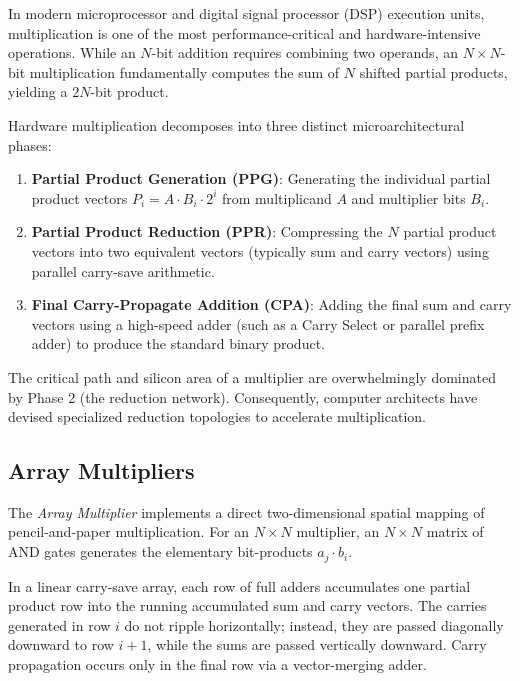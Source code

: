In modern microprocessor and digital signal processor (DSP) execution units, multiplication is one of the most performance-critical and hardware-intensive operations. While an $N$-bit addition requires combining two operands, an $N \times N$-bit multiplication fundamentally computes the sum of $N$ shifted partial products, yielding a $2N$-bit product.

Hardware multiplication decomposes into three distinct microarchitectural phases:
\begin{enumerate}
    \item \textbf{Partial Product Generation (PPG)}: Generating the individual partial product vectors $P_i = A \cdot B_i \cdot 2^i$ from multiplicand $A$ and multiplier bits $B_i$.
    \item \textbf{Partial Product Reduction (PPR)}: Compressing the $N$ partial product vectors into two equivalent vectors (typically sum and carry vectors) using parallel carry-save arithmetic.
    \item \textbf{Final Carry-Propagate Addition (CPA)}: Adding the final sum and carry vectors using a high-speed adder (such as a Carry Select or parallel prefix adder) to produce the standard binary product.
\end{enumerate}

The critical path and silicon area of a multiplier are overwhelmingly dominated by Phase 2 (the reduction network). Consequently, computer architects have devised specialized reduction topologies to accelerate multiplication.

\subsection{Array Multipliers}

The \textit{Array Multiplier} implements a direct two-dimensional spatial mapping of pencil-and-paper multiplication. For an $N \times N$ multiplier, an $N \times N$ matrix of AND gates generates the elementary bit-products $a_j \cdot b_i$. 

In a linear carry-save array, each row of full adders accumulates one partial product row into the running accumulated sum and carry vectors. The carries generated in row $i$ do not ripple horizontally; instead, they are passed diagonally downward to row $i+1$, while the sums are passed vertically downward. Carry propagation occurs only in the final row via a vector-merging adder.

